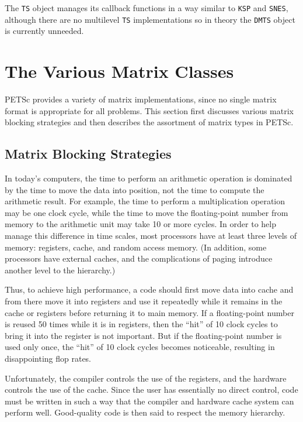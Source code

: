 The \lstinline{TS} object manages its callback functions in a way similar to \lstinline{KSP}
and \lstinline{SNES}, although there are no multilevel \lstinline{TS} implementations so in
theory the \lstinline{DMTS} object is currently unneeded.


\chapter{The Various Matrix Classes}
\label{sec:matclasses}

PETSc provides a variety of matrix implementations, since no single
matrix format is appropriate for all problems.  This section first
discusses various matrix blocking strategies and then
describes the assortment of matrix types in PETSc.

\section{Matrix Blocking Strategies}

In today's computers, the time to perform an arithmetic operation is
dominated by the time to move the data into position, not the time to
compute the arithmetic result.  For example, the time to perform a
multiplication operation may be one clock cycle, while the time to
move the floating-point number from memory to the arithmetic unit may
take 10 or more cycles. In order to help manage this difference in time scales,
most processors have at least three levels of memory: registers,
cache, and random access memory. (In addition, some processors
have external caches, and the complications of paging introduce
another level to the hierarchy.)

Thus, to achieve high performance, a code should first move data into
cache and from there move it into registers and use it repeatedly
while it remains in the cache or registers before returning it to main
memory. If a floating-point number is reused 50 times while it is in
registers, then the ``hit'' of 10 clock cycles to bring it into the
register is not important. But if the floating-point number is used
only once, the ``hit'' of 10 clock cycles becomes  noticeable,
resulting in disappointing flop rates.

Unfortunately, the compiler controls the use of the registers, and the
hardware controls the use of the cache. Since the user has essentially
no direct control, code must be written in such a way that the
compiler and hardware cache system can perform well. Good-quality code
is then said to respect the memory hierarchy.

